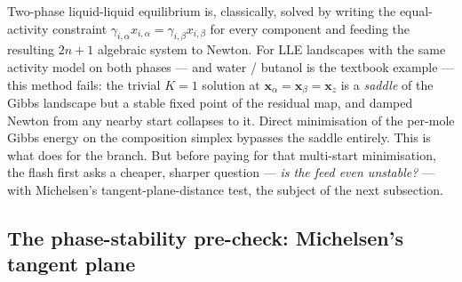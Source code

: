 \documentclass[11pt,a4paper]{article}
\newcommand{\xv}{\mathbf{x}}
\begin{document}
\begin{whatyoulllearn}
Two-phase liquid-liquid equilibrium is, classically, solved by writing
the equal-activity constraint $\gamma_{i,\alpha} x_{i,\alpha} =
\gamma_{i,\beta} x_{i,\beta}$ for every component and feeding the
resulting $2n + 1$ algebraic system to Newton.  For LLE landscapes
with the same activity model on both phases --- and water / butanol
is the textbook example --- this method fails: the trivial $K = 1$
solution at $\xv_\alpha = \xv_\beta = \xv_z$ is a \emph{saddle} of the
Gibbs landscape but a stable fixed point of the residual map, and
damped Newton from any nearby start collapses to it.  Direct
minimisation of the per-mole Gibbs energy on the composition simplex
bypasses the saddle entirely.  This is what 
does for the  branch.  But before paying for that
multi-start minimisation, the flash first asks a cheaper, sharper
question --- \emph{is the feed even unstable?} --- with Michelsen's
tangent-plane-distance test, the subject of the next subsection.
\end{whatyoulllearn}

\subsection{The phase-stability pre-check: Michelsen's tangent plane}
\label{sec:tpd}
\end{document}
